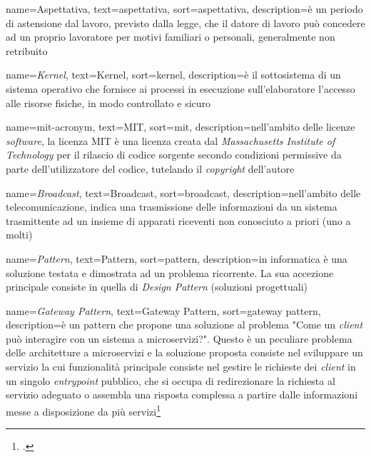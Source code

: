 {
  name=Aspettativa,
  text=aspettativa,
  sort=aspettativa,
  description={è un periodo di astensione dal lavoro, previsto dalla legge, che il datore di lavoro può concedere ad un proprio lavoratore per motivi familiari o personali, generalmente non retribuito}
}

{
  name=\emph{Kernel},
  text={Kernel},
  sort=kernel,
  description={è il sottosistema di un sistema operativo che fornisce ai processi in esecuzione sull'elaboratore l'accesso alle risorse fisiche, in modo controllato e sicuro}
}

{
  name=\gls{mit-acronym},
  text=MIT,
  sort=mit,
  description={nell'ambito delle licenze \emph{software}, la licenza MIT è una licenza creata dal \emph{Massachusetts Institute of Technology} per il rilascio di codice sorgente secondo condizioni permissive da parte dell'utilizzatore del codice, tutelando il \emph{copyright} dell'autore}
}

{
  name=\emph{Broadcast},
  text={Broadcast},
  sort=broadcast,
  description={nell'ambito delle telecomunicazione, indica una trasmissione delle informazioni da un sistema trasmittente ad un insieme di apparati riceventi non conosciuto a priori (uno a molti)}
}

{
  name=\emph{Pattern},
  text={Pattern},
  sort=pattern,
  description={in informatica è una soluzione testata e dimostrata ad un problema ricorrente. La sua accezione principale consiste in quella di \emph{Design Pattern} (soluzioni progettuali)}
}

{
  name=\emph{Gateway Pattern},
  text={Gateway Pattern},
  sort=gateway pattern,
  description={è un \gls{pattern} che propone una soluzione al problema "Come un \emph{client} può interagire con un sistema a microservizi?". Questo è un peculiare problema delle architetture a microservizi e la soluzione proposta consiste nel sviluppare un servizio la cui funzionalità principale consiste nel gestire le richieste dei \emph{client} in un singolo \emph{entrypoint} pubblico, che si occupa di redirezionare la richiesta al servizio adeguato o assembla una risposta complessa a partire dalle informazioni messe a disposizione da più servizi\footcite{gateway-pattern}}
}
